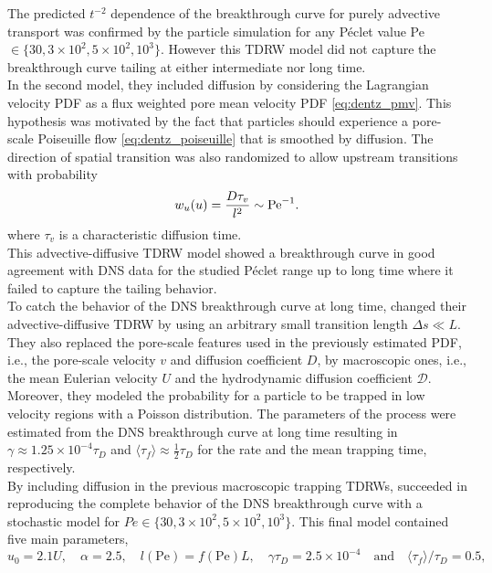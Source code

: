 The predicted $t^{-2}$ dependence of the breakthrough curve for purely advective transport was confirmed by the particle simulation for any Péclet value Pe$\in\{30, 3\times 10^2, 5\times 10^2, 10^3\}$. However this TDRW model did not capture the breakthrough curve tailing at either intermediate nor long time.\\
In the second model, they included diffusion by considering the Lagrangian velocity PDF as a flux weighted pore mean velocity PDF \eqref{eq:dentz_pmv}. This hypothesis was motivated by the fact that particles should experience a pore-scale Poiseuille flow \eqref{eq:dentz_poiseuille} that is smoothed by diffusion.
The direction of spatial transition was also randomized to allow upstream transitions with probability 
\begin{equation}\label{eq:dentz_wu}
w_u(u)=\frac{D\tau_v}{l^2}\sim \mathrm{Pe}^{-1}.
\end{equation}
where $\tau_v$ is a characteristic diffusion time.\\
This advective-diffusive TDRW model showed a breakthrough curve in good agreement with DNS data for the studied Péclet range up to long time where it failed to capture the tailing behavior. \\
To catch the behavior of the DNS breakthrough curve at long time, \citeauthor{Dentz2017} changed their advective-diffusive TDRW by using an arbitrary small transition length $\Delta s\ll L$. 
They also replaced the pore-scale features used in the previously estimated PDF, i.e., the pore-scale velocity $v$ and diffusion coefficient $D$, by macroscopic ones, i.e., the mean Eulerian velocity $U$ and the hydrodynamic diffusion coefficient $\mathcal{D}$.\\
Moreover, they modeled the probability for a particle to be trapped in low velocity regions with a Poisson distribution. 
The parameters of the process were estimated from the DNS breakthrough curve at long time resulting in $\gamma\approx1.25\times 10^{-4}\tau_D$ and $\langle\tau_f\rangle\approx\frac{1}{2}\tau_D$ for the rate and the mean trapping time, respectively.\\
By including diffusion in the previous macroscopic trapping TDRWs, \citeauthor{Dentz2017} succeeded in reproducing the complete behavior of the DNS breakthrough curve with a stochastic model for $Pe\in\{30, 3\times 10^2, 5\times 10^2, 10^3\}$. This final model contained five main parameters,
\[
u_0=2.1U,\quad\alpha=2.5,\quad l(\mathrm{Pe})=f(\mathrm{Pe})L,\quad\gamma\tau_D=2.5\times 10^{-4}\quad\textrm{and}\quad\langle\tau_f\rangle/\tau_D=0.5,
\]
